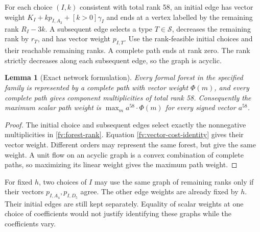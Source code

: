\documentclass[11pt]{article}
\newtheorem{lemma}[theorem]{Lemma}
\theoremstyle{definition}
\theoremstyle{remark}
\numberwithin{equation}{section}
\begin{document}
For each choice $(I,k)$ consistent with total rank 58, an initial
edge has vector weight $K_I+kp_{I,A_3}+[k>0]\gamma_I$ and ends
at a vertex labelled by the remaining rank $R_I-3k$. A subsequent
edge selects a type $T\in\mathcal S$, decreases the remaining rank
by $r_T$, and has vector weight $p_{I,T}$. Use the rank-feasible initial choices and their reachable remaining
ranks. A complete path ends at rank zero. The rank strictly decreases
along each subsequent edge, so the graph is acyclic.

\begin{lemma}[Exact network formulation]\label{fv:network-exact}
Every formal forest in the specified family is represented by a
complete path with vector weight $\Phi(m)$, and every complete path
gives component multiplicities of total rank 58. Consequently the
maximum scalar path weight is
$\max_m a^{58}\cdot\Phi(m)$ for every signed vector $a^{58}$.
\end{lemma}

\begin{proof}
The initial choice and subsequent edges select exactly the
nonnegative multiplicities in \eqref{fv:forest-rank}. Equation
\eqref{fv:vector-cost-identity} gives their vector weight. Different
orders may represent the same forest, but give the same weight.
A unit flow on an acyclic graph is a convex combination of complete
paths, so maximizing its linear weight gives the maximum path weight.
\end{proof}

For fixed $h$, two choices of $I$ may use the same graph of remaining
ranks only if their vectors $p_{I,A_4},p_{I,D_5}$ agree. The other
edge weights are already fixed by $h$. Their initial edges are still
kept separately. Equality of scalar weights at one choice of
coefficients would not justify identifying these graphs while the
coefficients vary.
\end{document}

